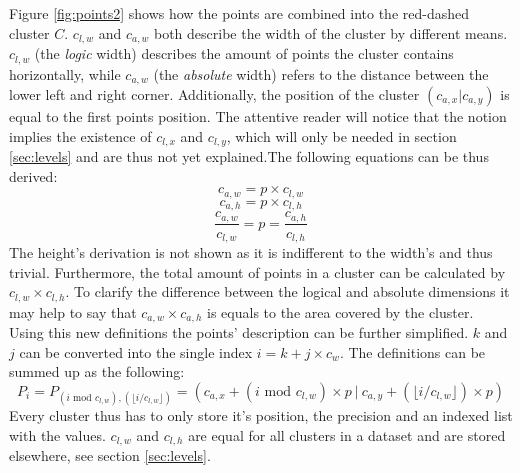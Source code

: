 \documentclass[10pt,a4paper,titlepage]{article}
\begin{document}
	Figure \ref{fig:points2} shows how the points are combined into the red-dashed cluster \(C\). \(c_{l,w}\) and \(c_{a,w}\) both describe the width of the cluster by different means. \(c_{l,w}\) (the \emph{logic} width) describes the amount of points the cluster contains horizontally, while \(c_{a,w}\) (the \emph{absolute} width) refers to the distance between the lower left and right corner. Additionally, the position of the cluster \((c_{a,x}|c_{a,y})\) is equal to the first points position. The attentive reader will notice that the notion implies the existence of \(c_{l,x}\) and \(c_{l,y}\), which will only be needed in section \ref{sec:levels} and are thus not yet explained.The following equations can be thus derived:
	\[c_{a,w} = p \times c_{l,w}\]
	\[c_{a,h} = p \times c_{l,h}\]
	\[\frac{c_{a,w}}{c_{l,w}} = p = \frac{c_{a,h}}{c_{l,h}}\]
	The height's derivation is not shown as it is indifferent to the width's and thus trivial. Furthermore, the total amount of points in a cluster can be calculated by \(c_{l,w} \times c_{l,h}\). To clarify the difference between the logical and absolute dimensions it may help to say that \(c_{a,w} \times c_{a,h}\) is equals to the area covered by the cluster.\\
	Using this new definitions the points' description can be further simplified. \(k\) and \(j\) can be converted into the single index \(i = k + j \times c_w\). The definitions can be summed up as the following:
	\[P_{i} = P_{(i \text{ mod } c_{l,w}), (\lfloor{i}/{c_{l,w}} \rfloor)} = (c_{a,x} + (i \text{ mod } c_{l,w}) \times p~|~c_{a,y} + (\lfloor{i}/{c_{l,w}} \rfloor) \times p)\]
	Every cluster thus has to only store it's position, the precision and an indexed list with the values. \(c_{l,w}\) and \(c_{l,h}\) are equal for all clusters in a dataset and are stored elsewhere, see section \ref{sec:levels}.
\end{document}
